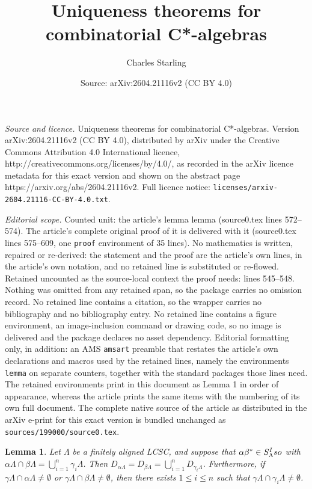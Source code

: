 \documentclass[10pt,a4paper]{amsart}
\title{Uniqueness theorems for combinatorial C*-algebras}
\author{Charles Starling}
\date{Source: arXiv:2604.21116v2 (CC BY 4.0)}
\newtheorem{lemma}{Lemma}
\newcommand{\Iso}{\textup{Iso}}
\renewcommand{\L}{\Lambda}
\begin{document}
\maketitle

\noindent\emph{Source and licence.} Uniqueness theorems for combinatorial C*-algebras. Version arXiv:2604.21116v2 (CC BY 4.0), distributed by arXiv under the Creative Commons Attribution 4.0 International licence, http://creativecommons.org/licenses/by/4.0/, as recorded in the arXiv licence metadata for this exact version and shown on the abstract page https://arxiv.org/abs/2604.21116v2. Full licence notice: \texttt{licenses/arxiv-2604.21116-CC-BY-4.0.txt}.\par\smallskip

\noindent\textit{Editorial scope.} Counted unit: the article's lemma lemma (source0.tex lines 572--574). The article's complete original proof of it is delivered with it (source0.tex lines 575--609, one \texttt{proof} environment of 35 lines). No mathematics is written, repaired or re-derived: the statement and the proof are the article's own lines, in the article's own notation, and no retained line is substituted or re-flowed.  Retained uncounted as the source-local context the proof needs: lines 545--548.  Nothing was omitted from any retained span, so the package carries no omission record.  No retained line contains a citation, so the wrapper carries no bibliography and no bibliography entry.  No retained line contains a figure environment, an image-inclusion command or drawing code, so no image is delivered and the package declares no asset dependency.  Editorial formatting only, in addition: an AMS \texttt{amsart} preamble that restates the article's own declarations and macros used by the retained lines, namely the environments \texttt{lemma} on separate counters, together with the standard packages those lines need.  The retained environments print in this document as Lemma 1 in order of appearance, whereas the article prints the same items with the numbering of its own full document.  The complete native source of the article as distributed in the arXiv e-print for this exact version is bundled unchanged as \texttt{sources/199000/source0.tex}.
	\begin{lemma}\label{lem:iso_intersection}
		Let $\L$ be a finitely aligned LCSC, and suppose that $\alpha\beta^*\in S_\L^\Iso$ with $\alpha\L\cap \beta\L = \bigcup_{i=1}^n\gamma_i\L$. Then $D_{\alpha\L} = D_{\beta\L} = \bigcup_{i=1}^nD_{\gamma_i\L}$. Furthermore, if $\gamma\L\cap \alpha\L \neq \emptyset$ or $\gamma\L\cap \beta\L \neq \emptyset$, then there exists $1\leq i\leq n$ such that $\gamma\L\cap\gamma_i\L\neq \emptyset$.
		
	\end{lemma}
\end{document}
